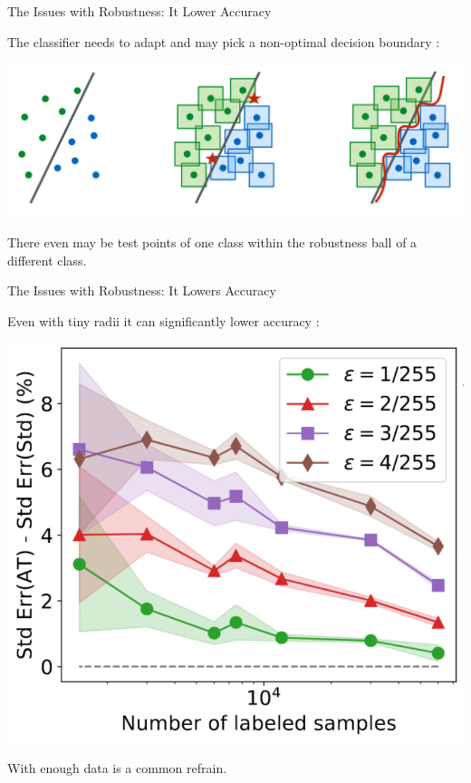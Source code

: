\documentclass{beamer}
\begin{document}
\begin{frame}{The Issues with Robustness: It Lower Accuracy}
    \begin{center}
        The classifier needs to adapt and may pick a non-optimal decision boundary \cite{robustness_issue}:

        \includegraphics[scale=0.25]{robustness_issue.png}

        There even may be test points of one class within the robustness ball of a different class. 
    \end{center}
\end{frame}

\begin{frame}{The Issues with Robustness: It Lowers Accuracy}
    \begin{center}
        Even with tiny radii it can significantly lower accuracy \cite{robustness_tradeoff_infinite_data}:

        \includegraphics[scale=0.22]{accuracy_of_robust_nn.png}

        With enough data is a common refrain. 
    \end{center}
\end{frame}
\end{document}
